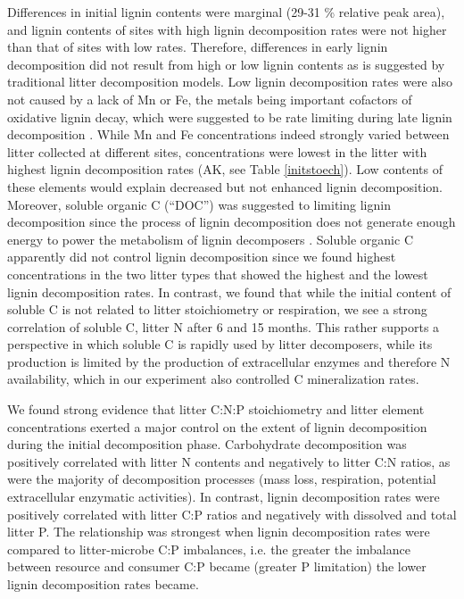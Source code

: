 Differences in initial lignin contents were marginal (29-31 \% relative peak area), and lignin contents of sites with high lignin decomposition rates were not higher than that of sites with low rates. Therefore, differences in early lignin decomposition did not result from high or low lignin contents as is suggested by traditional litter decomposition models. Low lignin decomposition rates were also not caused by a lack of Mn or Fe, the metals being important cofactors of oxidative lignin decay, which were suggested to be rate limiting during late lignin decomposition \cite{Berg2008}. While Mn and Fe concentrations indeed strongly varied between litter collected at different sites, concentrations were lowest in the litter with highest lignin decomposition rates (AK, see Table \ref{initstoech}). Low contents of these elements would explain decreased but not enhanced lignin decomposition. Moreover, soluble organic C (``DOC'') was suggested to limiting lignin decomposition since the process of lignin decomposition does not generate enough energy to power the metabolism of lignin decomposers \cite{Klotzbucher2011}. Soluble organic C apparently did not control lignin decomposition since we found highest concentrations in the two litter types that showed the highest and the lowest lignin decomposition rates. In contrast, we found that while the initial content of soluble C is not related to litter stoichiometry or respiration, we see a strong correlation of soluble C, litter N after 6 and 15 months. This rather supports a perspective in which soluble C is rapidly used by litter decomposers, while its production is limited by the production of extracellular enzymes and therefore N availability, which in our experiment also controlled C mineralization rates.

We found strong evidence that litter C:N:P stoichiometry and litter element concentrations exerted a major control on the extent of lignin decomposition during the initial decomposition phase. Carbohydrate decomposition was positively correlated with litter N contents and negatively to litter C:N ratios, as were the majority of decomposition processes (mass loss, respiration, potential extracellular enzymatic activities). In contrast, lignin decomposition rates were positively correlated with litter C:P ratios and negatively with dissolved and total litter P. The relationship was strongest when lignin decomposition rates were compared to litter-microbe C:P imbalances, i.e. the greater the imbalance between resource and consumer C:P became (greater P limitation) the lower lignin decomposition rates became.

